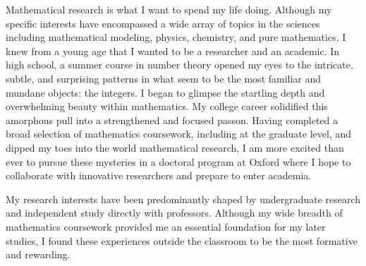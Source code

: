\documentclass[10pt]{amsart}
\begin{document}
Mathematical research is what I want to spend my life doing. Although my specific interests have encompassed a wide array of topics in the sciences including mathematical modeling, physics, chemistry, and pure mathematics, I knew from a young age that I wanted to be a researcher and an academic. In high school, a summer course in number theory opened my eyes to the intricate, subtle, and surprising patterns in what seem to be the most familiar and mundane objects: the integers. I began to glimpse the startling depth and overwhelming beauty within mathematics. My college career solidified this amorphous pull into a strengthened and focused passon. Having completed a broad selection of mathematics coursework, including at the graduate level, and dipped my toes into the world mathematical research, I am more excited than ever to pursue these mysteries in a doctoral program at Oxford where I hope to collaborate with innovative researchers and prepare to enter academia.

\par

My research interests have been predominantly shaped by undergraduate research and independent study directly with professors. Although my wide breadth of mathematics coursework provided me an essential foundation for my later studies, I found these experiences outside the classroom to be the most formative and rewarding. 
\end{document}
